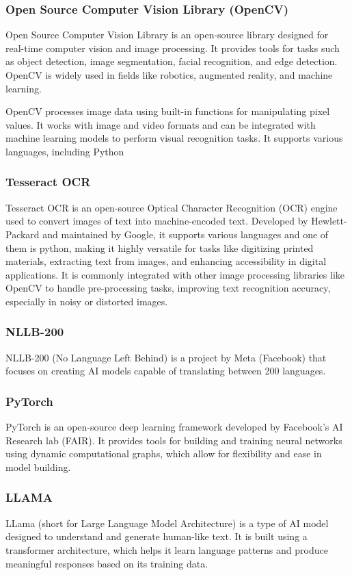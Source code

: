 \documentclass[12pt,oneside,openright,a4paper]{cpe-english-project}
\begin{document}
\subsubsection{Open Source Computer Vision Library (OpenCV)} Open Source Computer Vision Library is an open-source library designed for real-time computer vision and image processing. It provides tools for tasks such as object detection, image segmentation, facial recognition, and edge detection. OpenCV is widely used in fields like robotics, augmented reality, and machine learning.\par
OpenCV processes image data using built-in functions for manipulating pixel values. It works with image and video formats and can be integrated with machine learning models to perform visual recognition tasks. It supports various languages, including Python

\subsubsection{Tesseract OCR} Tesseract OCR is an open-source Optical Character Recognition (OCR) engine used to convert images of text into machine-encoded text. Developed by Hewlett-Packard and maintained by Google, it supports various languages and one of them is python, making it highly versatile for tasks like digitizing printed materials, extracting text from images, and enhancing accessibility in digital applications. It is commonly integrated with other image processing libraries like OpenCV to handle pre-processing tasks, improving text recognition accuracy, especially in noisy or distorted images.

\subsubsection{NLLB-200} NLLB-200 (No Language Left Behind) is a project by Meta (Facebook) that focuses on creating AI models capable of translating between 200 languages.

\subsubsection{PyTorch} PyTorch is an open-source deep learning framework developed by Facebook's AI Research lab (FAIR). It provides tools for building and training neural networks using dynamic computational graphs, which allow for flexibility and ease in model building.

\subsubsection{LLAMA} LLama (short for Large Language Model Architecture) is a type of AI model designed to understand and generate human-like text. It is built using a transformer architecture, which helps it learn language patterns and produce meaningful responses based on its training data.
\end{document}
